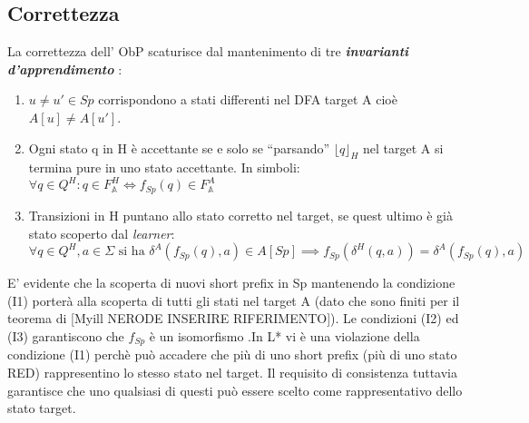 \subsection{Correttezza}
La correttezza dell' \ac{ObP} scaturisce dal mantenimento di tre \textit{\textbf{invarianti d'apprendimento}} :
\begin{enumerate}[label=\textbf{{(I}\arabic*{)}}]
  \item $u \neq u' \in Sp$ corrispondono a stati differenti nel \ac{DFA} target A cioè $A[u] \neq A[u']$.
  \item Ogni stato q in \ac{H} è accettante se e solo se ``parsando'' $\lfloor q \rfloor_{H}$ nel target A si termina pure in uno stato accettante. In simboli: $\forall q \in Q^{H} : q \in  F_{\mathbb{A}}^{H} \Leftrightarrow f_{Sp}(q) \in F_{\mathbb{A}}^{A}$
  \item Transizioni in \ac{H} puntano allo stato corretto nel target, se quest ultimo è già stato scoperto dal \textit{learner}: $\forall q \in Q^{H}, a \in \Sigma \text{ si ha } \delta^{A}(f_{Sp}(q),a) \in A[Sp] \implies f_{Sp}(\delta^{H}(q,a)) = \delta^{A}(f_{Sp}(q),a)$
\end{enumerate}
E' evidente che la scoperta di nuovi short prefix in Sp mantenendo la condizione (I1)  porterà alla scoperta di tutti gli stati nel target A (dato che sono finiti per il teorema di [Myill NERODE INSERIRE RIFERIMENTO]). Le condizioni (I2) ed (I3) garantiscono che $f_{Sp}$ è un isomorfismo .In L* vi è una violazione della condizione (I1) perchè può accadere che più di uno short prefix (più di uno stato RED) rappresentino lo stesso stato nel target. Il requisito di consistenza tuttavia garantisce che uno qualsiasi di questi può essere scelto come rappresentativo dello stato target.\\

